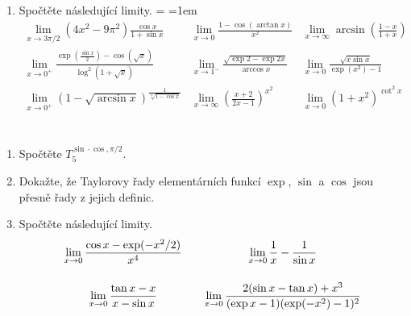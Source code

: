 \section*{}
\begin{enumerate}
 \item Spočtěte následující limity.
  {\everymath={\displaystyle}
   \arraycolsep=1em
   \[
    \begin{array}{lll}
     \lim_{x \to 3 \pi / 2} (4x^2 - 9\pi^2) \frac{\cos x}{1 + \sin x} & \lim_{x
     \to 0} \frac{1 - \cos(\arctan x)}{x^2} & \lim_{x \to \infty} \arcsin \left(
     \frac{1-x}{1+x}\right)\\[2em]
     \lim_{x \to 0^{+}} \frac{\exp \left( \frac{\sin x}{2} \right) - \cos
     (\sqrt{x})}{\log^2(1 + \sqrt{x})} & \lim_{x \to 1^{-}} \frac{\sqrt{\exp 2 -
    \exp 2x}}{\arccos x} & \lim_{x \to 0} \frac{\sqrt{x \sin x}}{\exp(x^2) -
    1}\\[2em]
    \lim_{x \to 0^{+}} \left( 1 - \sqrt{\arcsin x} \right)^{\frac{1}{\sqrt[4]{1 -
  \cos x}}} & \lim_{x \to \infty} \left( \frac{x+2}{2x-1} \right)^{x^2} & \lim_{x
  \to 0} (1 + x^2)^{\cot^2 x}
    \end{array}
   \]
  }
\end{enumerate}

\section*{}
\begin{enumerate}
 \item Spočtěte $T^{\sin \cdot \cos,\pi / 2}_5$.
 \item Dokažte, že Taylorovy řady elementárních funkcí $\exp$, $\sin$ a $\cos$ jsou
 přesně řady z jejich definic.
 \item Spočtěte následující limity.
  \[
   {\everymath={\displaystyle}
    \arraycolsep=1em
    \begin{array}{cc}
     \lim_{x \to 0} \frac{\cos x - \exp(-x^2 / 2)}{x^{4}} & \lim_{x \to 0}
     \frac{1}{x} - \frac{1}{\sin x}\\[2em]
     \lim_{x \to 0} \frac{\tan x - x}{x - \sin x} & \lim_{x \to 0} \frac{2(\sin x
     - \tan x) + x^3}{(\exp x - 1)(\exp(-x^2)-1)^2}
    \end{array}
   }
  \]
\end{enumerate}

